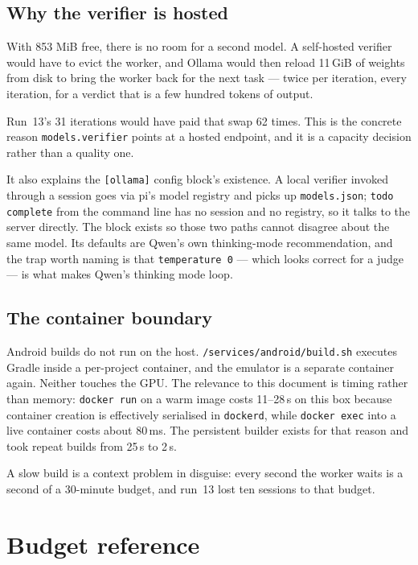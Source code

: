 \documentclass[11pt,a4paper]{article}
\newcommand{\file}[1]{\texttt{#1}}
\newcommand{\key}[1]{\texttt{#1}}
\begin{document}
\subsection{Why the verifier is hosted}

With 853 MiB free, there is no room for a second model. A self-hosted verifier
would have to evict the worker, and Ollama would then reload 11\,GiB of weights
from disk to bring the worker back for the next task --- twice per iteration,
every iteration, for a verdict that is a few hundred tokens of output.

Run~13's 31 iterations would have paid that swap 62 times. This is the concrete
reason \key{models.verifier} points at a hosted endpoint, and it is a capacity
decision rather than a quality one.

It also explains the \key{[ollama]} config block's existence. A local verifier
invoked through a session goes via pi's model registry and picks up
\file{models.json}; \texttt{todo complete} from the command line has no session
and no registry, so it talks to the server directly. The block exists so those
two paths cannot disagree about the same model. Its defaults are Qwen's own
thinking-mode recommendation, and the trap worth naming is that
\texttt{temperature 0} --- which looks correct for a judge --- is what makes
Qwen's thinking mode loop.

\subsection{The container boundary}

Android builds do not run on the host. \file{/services/android/build.sh} executes
Gradle inside a per-project container, and the emulator is a separate container
again. Neither touches the GPU. The relevance to this document is timing rather
than memory: \texttt{docker run} on a warm image costs 11--28\,s on this box
because container creation is effectively serialised in \texttt{dockerd}, while
\texttt{docker exec} into a live container costs about 80\,ms. The persistent
builder exists for that reason and took repeat builds from 25\,s to 2\,s.

A slow build is a context problem in disguise: every second the worker waits is
a second of a 30-minute budget, and run~13 lost ten sessions to that budget.

\section{Budget reference}
\end{document}
